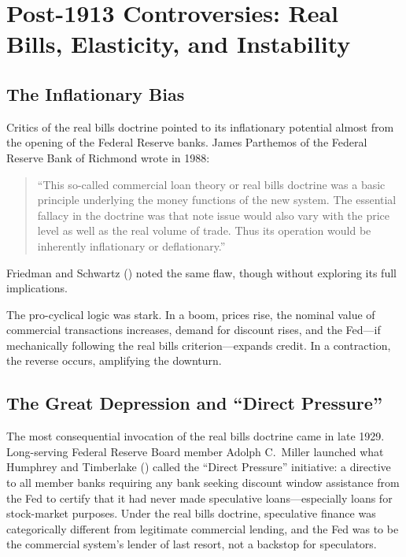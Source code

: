 \documentclass[12pt]{article}
\begin{document}
\section{Post-1913 Controversies: Real Bills, Elasticity, and Instability}
\label{sec:aftermath}

\subsection{The Inflationary Bias}

Critics of the real bills doctrine pointed to its inflationary potential almost
from the opening of the Federal Reserve banks.  James Parthemos of the
Federal Reserve Bank of Richmond wrote in 1988:
\begin{quote}
``This so-called commercial loan theory or real bills doctrine was a basic principle
underlying the money functions of the new system.  The essential fallacy in the
doctrine was that note issue would also vary with the price level as well as the
real volume of trade.  Thus its operation would be inherently inflationary or
deflationary.'' \citep{parthemos1988}
\end{quote}
Friedman and Schwartz (\citeyear{friedman-schwartz1963}) noted the same flaw, though
without exploring its full implications.

The pro-cyclical logic was stark.  In a boom, prices rise, the nominal value of
commercial transactions increases, demand for discount rises, and the Fed---if
mechanically following the real bills criterion---expands credit.  In a contraction,
the reverse occurs, amplifying the downturn.

\subsection{The Great Depression and ``Direct Pressure''}

The most consequential invocation of the real bills doctrine came in late 1929.
Long-serving Federal Reserve Board member Adolph C.\ Miller launched what Humphrey
and Timberlake (\citeyear{humphrey-timberlake2019}) called the ``Direct Pressure''
initiative: a directive to all member banks requiring any bank seeking discount
window assistance from the Fed to certify that it had never made speculative
loans---especially loans for stock-market purposes.  Under the real bills doctrine,
speculative finance was categorically different from legitimate commercial lending,
and the Fed was to be the commercial system's lender of last resort, not a
backstop for speculators.
\end{document}
